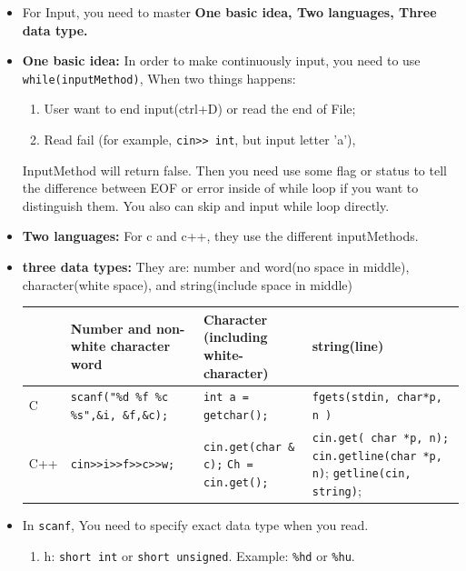 \documentclass[a4paper,11pt,twoside]{book}
\newcommand{\tophline}{\hline }
\newcommand{\bottomhline}{\\ \hline }
\newcommand{\tophline}{ }
\newcommand{\bottomhline}{ }
\begin{document}
\begin{itemize}
	\item For Input, you need to master \textbf{One basic idea, Two languages, Three data type.}
	\item \textbf{One basic idea:} In order to make continuously input, you need to use \texttt{while(inputMethod)}, When two things happens:
	\begin{enumerate}
		\item User want to end input(ctrl+D) or read the end of File;
		\item Read fail (for example,  \verb|cin>> int|, but input letter 'a'),
	\end{enumerate}
	
	InputMethod will return false.  Then you need use some flag or status to tell the difference between EOF or error inside of while loop if you want to distinguish them. You also can skip and input while loop directly.
	
	\item \textbf{Two languages:} For c and c++, they use the different inputMethods. 
	
	\item \textbf{three data types:} They are: number and word(no space in middle), character(white space), and string(include space in middle)
	
	\begin{tabular}{|p{}|p{}|p{}|p{}|}
		\tophline
		& Number and non-white  character word & Character (including white-character) & string(line)\\
		\tophline
		C &\texttt{scanf("\%d \%f \%c \%s",\&i, \&f,\&c);}  & \texttt{int a = getchar();} & \texttt{fgets(stdin, char*p, n )} \\
		\tophline
		C++ & \verb|cin>>i>>f>>c>>w;| & \texttt{cin.get(char \& c);} \newline  \texttt{Ch = cin.get();} & \texttt{cin.get( char *p, n);} \newline \texttt{cin.getline(char *p, n)}; \newline \texttt{getline(cin, string)};
		\bottomhline
	\end{tabular}
	
	
	\item In \texttt{scanf}, You need to specify exact data type when you read.
	\begin{enumerate}
		\item h:  \texttt{short int} or \texttt{short unsigned}. Example: \texttt{\%hd} or \texttt{\%hu}.
		

\end{enumerate}
\end{itemize}
\end{document}
